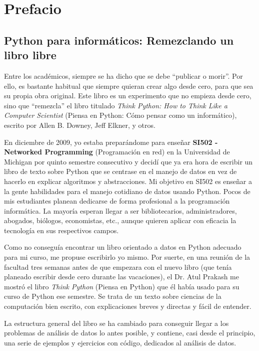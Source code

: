 
\chapter{Prefacio}

\section*{Python para informáticos: Remezclando un libro libre}

Entre los académicos, siempre se ha dicho que se debe ``publicar o morir''.
Por ello, es bastante habitual que siempre quieran crear algo desde cero,
para que sea su propia obra original. Este libro es un
experimento que no empieza desde cero, sino que ``remezcla''
el libro titulado
\emph{Think Python: How to Think Like
a Computer Scientist} (Piensa en Python: Cómo pensar como
un informático),
escrito por Allen B. Downey, Jeff Elkner, y otros.

En diciembre de 2009, yo estaba preparándome para enseñar
{\bf SI502 - Networked Programming} (Programación en red)
en la Universidad de Michigan
por quinto semestre consecutivo y decidí que ya era hora
de escribir un libro de texto sobre Python que se centrase en el manejo de datos
en vez de hacerlo en explicar algoritmos y abstracciones.
Mi objetivo en SI502 es enseñar a la gente habilidades para
el manejo cotidiano de datos usando Python.
Pocos de mis estudiantes planean dedicarse de forma profesional
a la programación informática. La mayoría esperan llegar a ser
bibliotecarios, administradores, abogados, biólogos, economistas, etc.,
aunque quieren aplicar con eficacia la tecnología en sus respectivos campos.

Como no conseguía encontrar un libro orientado a datos en Python
adecuado para mi curso, me propuse escribirlo yo mismo.
Por suerte, en una reunión de la facultad tres semanas
antes de que empezara con el nuevo libro (que tenía planeado
escribir desde cero durante las vacaciones),
el Dr. Atul Prakash me mostró el libro \emph{Think Python} (Piensa en Python)
que él había usado para su curso de Python ese semestre.
Se trata de un texto sobre ciencias de la computación bien escrito,
con explicaciones breves y directas y fácil de entender.

La estructura general del libro
se ha cambiado para conseguir llegar a los problemas de análisis de datos
lo antes posible, y contiene, casi desde el principio, una serie de ejemplos
y ejercicios con código, dedicados al análisis de datos.

